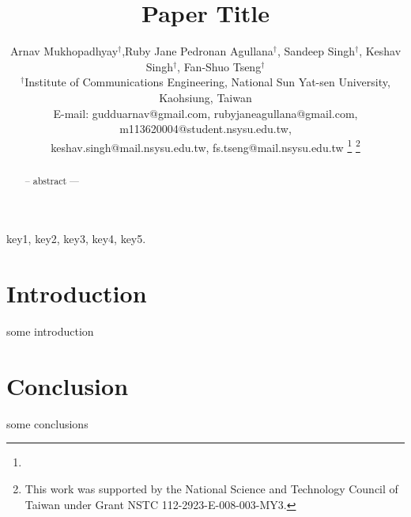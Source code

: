 \documentclass[conference]{IEEEtran}
\begin{document}
\title{Paper Title}
\author{Arnav Mukhopadhyay$^\dagger$,Ruby Jane Pedronan Agullana$^\dagger$, Sandeep Singh$^\dagger$, Keshav Singh$^\dagger$, Fan-Shuo Tseng$^\dagger$ \\
$^\dagger$Institute of Communications Engineering, National Sun Yat-sen University, Kaohsiung, Taiwan\\
{E-mail: gudduarnav@gmail.com, rubyjaneagullana@gmail.com, m113620004@student.nsysu.edu.tw,}\\
{{keshav.singh}@mail.nsysu.edu.tw, fs.tseng@mail.nsysu.edu.tw}\vspace{-1.15em}
\thanks{\hrulefill}
\thanks{This work was supported by the National Science and Technology Council of Taiwan under Grant NSTC 112-2923-E-008-003-MY3.}
}

\maketitle

\begin{abstract}
-- abstract ---
\end{abstract}
\begin{IEEEkeywords}
    key1, key2, key3, key4, key5.\vspace{-1.0em}
\end{IEEEkeywords}


\section{Introduction}\vspace{-0.25em}

some introduction \cite{exampleref}





\section{Conclusion}


some conclusions




\end{document}
